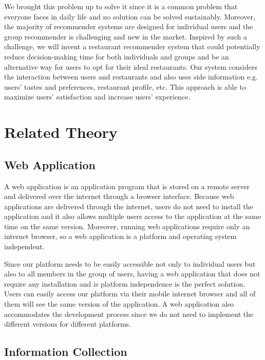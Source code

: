 \documentclass[12pt,oneside,openright,a4paper]{cpe-english-project}
\begin{document}
We brought this problem up to solve it since it is a common problem that everyone faces in daily life and no solution can be solved sustainably. Moreover, the majority of recommender systems are designed for individual users and the group recommender is challenging and new in the market. Inspired by such a challenge, we will invent a restaurant recommender system that could potentially reduce decision-making time for both individuals and groups and be an alternative way for users to opt for their ideal restaurants. Our system considers the interaction between users and restaurants and also uses side information e.g. users’ tastes and preferences, restaurant profile, etc. This approach is able to maximize users’ satisfaction and increase users’ experience.


\section{Related Theory}

\subsection{Web Application}

A web application is an application program that is stored on a remote server and delivered over the internet through a browser interface. \cite{WhatIsWebApplicationWebAppsAndItsBenefits} Because web applications are delivered through the internet, users do not need to install the application and it also allows multiple users access to the application at the same time on the same version. Moreover, running web applications require only an internet browser, so a web application is a platform and operating system independent.

Since our platform needs to be easily accessible not only to individual users but also to all members in the group of users, having a web application that does not require any installation and is platform independence is the perfect solution. Users can easily access our platform via their mobile internet browser and all of them will see the same version of the application. A web application also accommodates the development process since we do not need to implement the different versions for different platforms.

\subsection{Information Collection}
\end{document}
